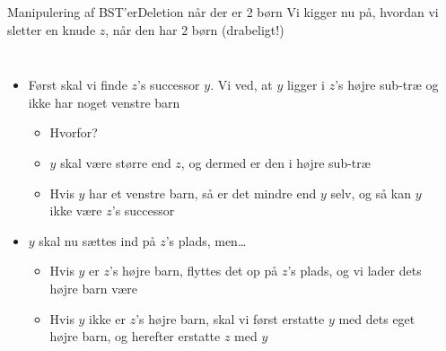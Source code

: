 \documentclass[aspectratio=1610]{beamer}
\begin{document}
\begin{frame}{Manipulering af BST'er}{Deletion når der er 2 børn}
    Vi kigger nu på, hvordan vi sletter en knude $z$, når den har 2 børn
    (drabeligt!)

    \begin{columns}
        \small
        \begin{itemize}[<+(1)->]
            \item Først skal vi finde $z$'s successor $y$. Vi ved, at $y$ ligger i
                $z$'s højre sub-træ og ikke har noget venstre barn
                \begin{itemize}
                    \item Hvorfor?
                    \item $y$ skal være større end $z$, og dermed er den i højre
                        sub-træ
                    \item Hvis $y$ har et venstre barn, så er det mindre end $y$
                        selv, og så kan $y$ ikke være $z$'s successor
                \end{itemize}
            \item $y$ skal nu sættes ind på $z$'s plads, men\ldots
                \begin{itemize}
                    \item Hvis $y$ er $z$'s højre barn, flyttes det op på $z$'s
                        plads, og vi lader dets højre barn være
                    \item Hvis $y$ \alert{ikke} er $z$'s højre barn, skal vi først
                        erstatte $y$ med dets eget højre barn, og herefter erstatte
                        $z$ med $y$
                \end{itemize}
        \end{itemize}


        \begin{columns}
            \centering
            


\end{columns}
\end{columns}
\end{frame}
\end{document}
